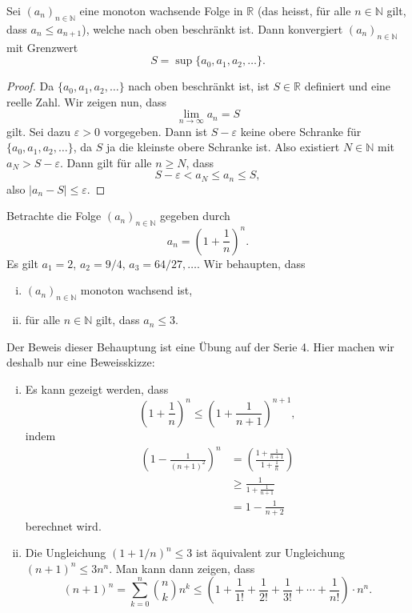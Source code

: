 \documentclass[../main.tex]{subfiles}
\begin{document}
\begin{claim}[Monotononieprinzip]
  Sei ${(a_n)}_{n \in \mathbb{N}}$ eine monoton wachsende
  Folge in $\mathbb{R}$ (das heisst, für alle
  $n \in \mathbb{N}$ gilt, dass $a_n \leq a_{n+1}$),
  welche nach oben beschränkt ist.
  Dann konvergiert ${(a_n)}_{n \in \mathbb{N}}$ mit
  Grenzwert
  \[
    S = \sup \{a_0, a_1, a_2, \dots\}.
  \]
\end{claim}

\begin{proof}
  Da $\{a_0, a_1, a_2, \dots\}$ nach oben beschränkt ist,
  ist $S \in \mathbb{R}$ definiert und eine reelle Zahl.
  Wir zeigen nun, dass
  \[
    \lim_{n \to \infty} a_n = S
  \]
  gilt.
  Sei dazu $\varepsilon > 0$ vorgegeben. 
  Dann ist $S - \varepsilon$ keine obere Schranke
  für $\{a_0, a_1, a_2, \dots\}$,
  da $S$ ja die kleinste obere Schranke ist.
  Also existiert $N \in \mathbb{N}$ mit
  $a_N > S - \varepsilon$.
  Dann gilt für alle $n \geq N$, dass
  \[
    S - \varepsilon < a_N \leq a_n \leq S,
  \]
  also $|a_n - S| \leq \varepsilon$.
\end{proof}

\begin{example}
  Betrachte die Folge ${(a_n)}_{n \in \mathbb{N}}$ 
  gegeben durch
   \[
   a_n = {\left( 1 + \frac{1}{n} \right)}^n.
   \]
   Es gilt $a_1 = 2$, $a_2 = 9/4$, $a_3 = 64/27, \dots$.
   Wir behaupten, dass
   \begin{enumerate}[(i)]
     \item ${(a_n)}_{n \in \mathbb{N}}$ monoton wachsend ist,
     \item für alle $n \in \mathbb{N}$ gilt, dass
       $a_n \leq 3$.
   \end{enumerate}
   Der Beweis dieser Behauptung ist eine Übung auf
   der Serie 4. Hier machen wir deshalb nur eine Beweisskizze:
   \begin{enumerate}[(i)]
     \item Es kann gezeigt werden, dass
       \[
         {\left( 1 + \frac{1}{n} \right) }^n \leq
         \left( 1 + \frac{1}{n+1} \right)^{n+1},
       \]
       indem 
       \begin{align*}
         \left( 1 - \frac{1}{(n+1)^2} \right)^n &=
         {\left( \frac{1 + \frac{1}{n+1}}{1 + \frac{1}{n}} \right) } \\& 
         \geq \frac{1}{1 + \frac{1}{n+1}}\\
                                                                                   &= 1 - \frac{1}{n+2}
       \end{align*}
       berechnet wird.
     \item
       Die Ungleichung $(1 + 1/n)^n \leq 3$ ist äquivalent
       zur Ungleichung $(n + 1)^n \leq 3n^n$.
       Man kann dann zeigen, dass
       \[
         (n+1)^n =
         \sum_{k=0}^{n} \binom{n}{k}n^k 
         \leq \left( 1 + \frac{1}{1!}
         + \frac{1}{2!} + \frac{1}{3!} + \cdots +
       \frac{1}{n!}\right) \cdot n^n.
       \]
   \end{enumerate}
\end{example}
\end{document}
